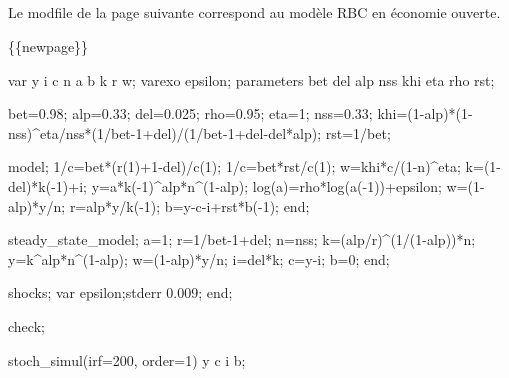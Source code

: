 \documentclass[
  letterpaper,
  DIV=11,
  numbers=noendperiod]{scrartcl}
\newenvironment{Shaded}{\begin{snugshade}}{\end{snugshade}}
\newcommand{\NormalTok}[1]{\textcolor[rgb]{0.00,0.23,0.31}{#1}}
\begin{document}
\subsection{}\label{section-1}

Le modfile de la page suivante correspond au modèle RBC en économie
ouverte.

\{\{newpage\}\}

\begin{Shaded}
\begin{Highlighting}[numbers=left,,]
\NormalTok{var y i c n a b k r w;}
\NormalTok{varexo epsilon;}
\NormalTok{parameters bet del alp nss khi eta rho rst;}

\NormalTok{bet=0.98;}
\NormalTok{alp=0.33;}
\NormalTok{del=0.025;}
\NormalTok{rho=0.95;}
\NormalTok{eta=1;}
\NormalTok{nss=0.33;}
\NormalTok{khi=(1{-}alp)*(1{-}nss)\^{}eta/nss*(1/bet{-}1+del)/(1/bet{-}1+del{-}del*alp);}
\NormalTok{rst=1/bet;}

\NormalTok{model;}
\NormalTok{1/c=bet*(r(1)+1{-}del)/c(1);}
\NormalTok{1/c=bet*rst/c(1);}
\NormalTok{w=khi*c/(1{-}n)\^{}eta;}
\NormalTok{k=(1{-}del)*k({-}1)+i;}
\NormalTok{y=a*k({-}1)\^{}alp*n\^{}(1{-}alp);}
\NormalTok{log(a)=rho*log(a({-}1))+epsilon;}
\NormalTok{w=(1{-}alp)*y/n;}
\NormalTok{r=alp*y/k({-}1);}
\NormalTok{b=y{-}c{-}i+rst*b({-}1);}
\NormalTok{end;}

\NormalTok{steady\_state\_model;}
\NormalTok{a=1;}
\NormalTok{r=1/bet{-}1+del;}
\NormalTok{n=nss;}
\NormalTok{k=(alp/r)\^{}(1/(1{-}alp))*n;}
\NormalTok{y=k\^{}alp*n\^{}(1{-}alp);}
\NormalTok{w=(1{-}alp)*y/n;}
\NormalTok{i=del*k;}
\NormalTok{c=y{-}i;}
\NormalTok{b=0;}
\NormalTok{end;}

\NormalTok{shocks;}
\NormalTok{var epsilon;stderr 0.009;}
\NormalTok{end;}

\NormalTok{check;}

\NormalTok{stoch\_simul(irf=200, order=1) y c i b;}
\end{Highlighting}
\end{Shaded}
\end{document}
